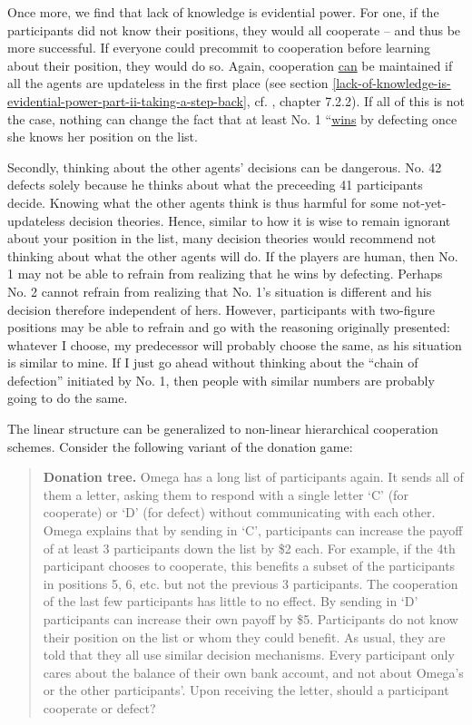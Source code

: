 Once more, we find that lack of knowledge is evidential power. For one,
if the participants did not know their positions, they would all
cooperate -- and thus be more successful. If everyone could precommit to
cooperation before learning about their position, they would do so.
Again, cooperation
\href{https://casparoesterheld.com/2016/11/21/thoughts-on-updatelessnes/}{can}
be maintained if all the agents are updateless in the first place (see
section
\ref{lack-of-knowledge-is-evidential-power-part-ii-taking-a-step-back}, cf.
\cite{Drescher2006-ky}, chapter 7.2.2). If all of this is not the
case, nothing can change the fact that at least No. 1
``\href{https://wiki.lesswrong.com/wiki/Rationality_is_systematized_winning}{wins}
by defecting once she knows her position on the list.

Secondly, thinking about the other agents' decisions can be dangerous.
No. 42 defects solely because he thinks about what the preceeding 41
participants decide. Knowing what the other agents think is thus harmful
for some not-yet-updateless decision theories. Hence, similar to how it
is wise to remain ignorant about your position in the list, many
decision theories would recommend not thinking about what the other
agents will do. If the players are human, then No. 1 may not be able to
refrain from realizing that he wins by defecting. Perhaps No. 2 cannot
refrain from realizing that No. 1's situation is different and his
decision therefore independent of hers. However, participants with
two-figure positions may be able to refrain and go with the reasoning
originally presented: whatever I choose, my predecessor will probably
choose the same, as his situation is similar to mine. If I just go ahead
without thinking about the ``chain of defection'' initiated by No. 1,
then people with similar numbers are probably going to do the same.

The linear structure can be generalized to non-linear hierarchical
cooperation schemes. Consider the following variant of the donation
game:

\begin{quote}
\textbf{Donation tree.} Omega has a long list of participants again. It
sends all of them a letter, asking them to respond with a single letter
`C' (for cooperate) or `D' (for defect) without communicating with each
other. Omega explains that by sending in `C', participants can increase
the payoff of at least 3 participants down the list by \$2 each. For
example, if the 4th participant chooses to cooperate, this benefits a
subset of the participants in positions 5, 6, etc. but not the previous
3 participants. The cooperation of the last few participants has little
to no effect. By sending in `D' participants can increase their own
payoff by \$5. Participants do not know their position on the list or
whom they could benefit. As usual, they are told that they all use
similar decision mechanisms. Every participant only cares about the
balance of their own bank account, and not about Omega's or the other
participants'. Upon receiving the letter, should a participant cooperate
or defect?
\end{quote}

